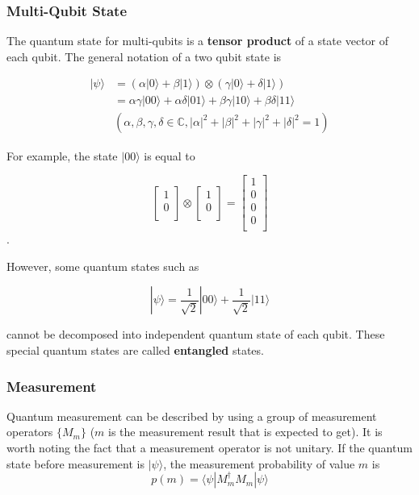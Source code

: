 \subsubsection{Multi-Qubit State}
  The quantum state for multi-qubits is a \textbf{tensor product} of a state vector of each qubit.  The general notation of a two qubit state is
  
\begin{align}
    |\psi\rangle & = (\alpha |0\rangle + \beta |1\rangle) \otimes  (\gamma |0\rangle + \delta |1\rangle) \nonumber\\
    & = \alpha \gamma |00\rangle + \alpha \delta |01\rangle + \beta \gamma |10\rangle + \beta \delta |11\rangle \nonumber\\ 
   & (\alpha, \beta, \gamma, \delta \in \mathbb{C}, |\alpha|^2+|\beta|^2+|\gamma|^2+|\delta|^2=1)
\end{align}
  
  For example, the state $|00\rangle$ is equal to 
  
\begin{equation}
  \left[
\begin{array}{c}
1 \\
0 \\
\end{array}
\right]
\otimes
 \left[
\begin{array}{c}
1 \\
0 \\
\end{array}
\right]
= \left[
\begin{array}{c}
1 \\
0 \\
0 \\
0 \\
\end{array}
\right]
\end{equation}.

 However, some quantum states such as
 
 \begin{equation}
 	|\psi\rangle = \frac{1}{\sqrt{2}}|00\rangle + \frac{1}{\sqrt{2}}|11\rangle
 \end{equation}
 
 cannot be decomposed into independent quantum state of each qubit.  These special quantum states are called \textbf{entangled} states.

 \subsubsection{Measurement}
Quantum measurement can be described by using a group of measurement operators $\{M_m\}$
($m$ is the measurement result that is expected to get). It is worth noting the fact that a measurement operator is not unitary.
 If the quantum state before measurement is $|\psi\rangle$, the measurement probability of value $m$ is 
 \begin{equation}
  p(m) = \langle \psi|M^{\dagger}_m M_m|\psi\rangle
 \end{equation}


